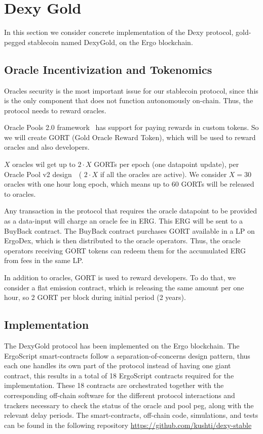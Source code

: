 \documentclass[a4paper,UKenglish,cleveref, autoref, thm-restate]{lipics-v2021}
\newcommand{\bc}{ERG}
\newcommand{\dx}{Dexy}
\newcommand{\dxg}{DexyGold}
\begin{document}
\section{Dexy Gold}
\label{sec:dexygold}

In this section we consider concrete implementation of the \dx{} protocol, gold-pegged stablecoin named \dxg{}, on the Ergo blockchain.

\subsection{Oracle Incentivization and Tokenomics}
\label{subsec:oracle-incentivization}

Oracles security is the most important issue for our stablecoin protocol, since this is the only component that does not function autonomously on-chain. Thus, the protocol needs to reward oracles.

Oracle Pools 2.0 framework~\cite{eip23} has support for paying rewards in custom tokens. So we will create GORT (Gold
Oracle Reward Token), which will be used to reward oracles and also developers.

$X$ oracles wil get up to $2 \cdot X$ GORTs per epoch (one datapoint update), per Oracle Pool v2 design~\cite{eip23}~(
$2 \cdot X$ if all the oracles are active). We consider $X = 30$ oracles with one hour long epoch, which means up to $60$
GORTs will be released to oracles.

Any transaction in the protocol that requires the oracle datapoint to be provided as a data-input will charge an oracle fee in \bc{}. This \bc{} will be sent to a BuyBack contract. The BuyBack contract purchases GORT available in a LP on ErgoDex, which is then distributed to the oracle operators.
Thus, the oracle operators receiving GORT tokens can redeem them for the accumulated \bc{} from fees in the same LP.

In addition to oracles, GORT is used to reward developers. To do that, we consider a flat emission contract, which is
releasing the same amount per one hour, so 2 GORT per block during initial period (2 years).

\subsection{Implementation}
The \dxg{} protocol has been implemented on the Ergo blockchain. The ErgoScript smart-contracts follow a separation-of-concerns design pattern, thus each one handles its own part of the protocol instead of having one giant contract, this results in a total of 18 ErgoScript contracts required for the implementation.
These 18 contracts are orchestrated together with the corresponding off-chain software for the different protocol interactions and trackers necessary to check the status of the oracle and pool peg, along with the relevant delay periods.
The smart-contracts, off-chain code, simulations, and tests can be found in the following repository \url{https://github.com/kushti/dexy-stable}





\end{document}
